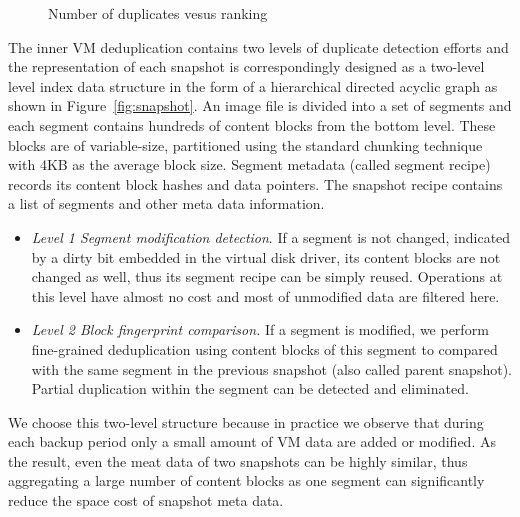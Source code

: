 \begin{figure*}[htbp]
\centering
{}
\caption{Number of duplicates vesus ranking}
\label{fig:zipf-data}
\end{figure*}
The inner VM deduplication contains two levels of duplicate detection efforts and the representation of
each snapshot is correspondingly designed as a two-level level index data structure in the form of a hierarchical
directed acyclic graph as shown in Figure~\ref{fig:snapshot}.
An image file is divided into a set of segments and each  segment contains hundreds of content blocks from the bottom level.
These blocks are of variable-size, partitioned using
the standard chunking technique~\cite{similar94} with 4KB as the average block size. 
Segment metadata (called segment recipe) records its  content block hashes and data pointers. 
The snapshot recipe contains a list of segments and other meta data information.
\begin{itemize}
\item {\em Level 1 Segment modification  detection}.
If a segment is not changed, indicated by a dirty bit embedded in the virtual disk driver, its content blocks are not changed as well, thus its segment recipe can be simply reused. Operations at this level have almost no cost and most of unmodified data are filtered here. 

\item {\em Level 2  Block fingerprint comparison.}
If a segment is modified, we perform fine-grained deduplication using content blocks of this segment to compared with 
the same segment in
the previous snapshot (also called parent snapshot). Partial duplication
within the segment can be detected and eliminated. 
\end{itemize}

We choose this two-level structure because in practice we observe that during each backup period only a small amount
of VM data are added or modified. As the result, even the meat data of two snapshots can be highly similar,
thus aggregating a large number of content blocks as one segment can significantly
reduce the space cost of snapshot meta data. 

